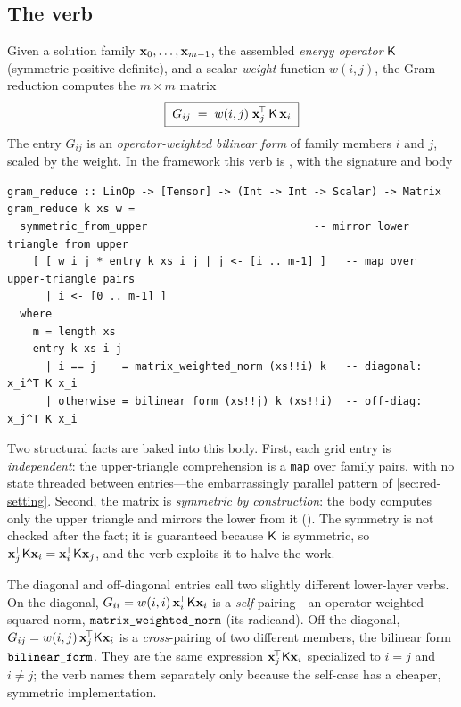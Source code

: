\subsection{The verb}

Given a solution family $\mathbf{x}_0,\dots,\mathbf{x}_{m-1}$, the assembled \emph{energy
operator} $\mathsf{K}$ (symmetric positive-definite), and a scalar \emph{weight}
function $w(i,j)$, the Gram reduction computes the $m\times m$ matrix
\begin{equation}
  \boxed{\;G_{ij} \;=\; w(i,j)\;\mathbf{x}_j^{\!\top}\,\mathsf{K}\,\mathbf{x}_i\;}
  \label{eq:gram-entry}
\end{equation}
The entry $G_{ij}$ is an \emph{operator-weighted bilinear form} of family
members $i$ and $j$, scaled by the weight. In the framework this verb is
, with the signature and body
\begin{lstlisting}[style=l4style]
gram_reduce :: LinOp -> [Tensor] -> (Int -> Int -> Scalar) -> Matrix
gram_reduce k xs w =
  symmetric_from_upper                          -- mirror lower triangle from upper
    [ [ w i j * entry k xs i j | j <- [i .. m-1] ]   -- map over upper-triangle pairs
      | i <- [0 .. m-1] ]
  where
    m = length xs
    entry k xs i j
      | i == j    = matrix_weighted_norm (xs!!i) k   -- diagonal: x_i^T K x_i
      | otherwise = bilinear_form (xs!!j) k (xs!!i)  -- off-diag:  x_j^T K x_i
\end{lstlisting}
Two structural facts are baked into this body. First, each grid entry is
\emph{independent}: the upper-triangle comprehension is a \texttt{map} over
family pairs, with no state threaded between entries---the embarrassingly
parallel pattern of \cref{sec:red-setting}. Second, the matrix is \emph{symmetric
by construction}: the body computes only the upper triangle and mirrors the lower
from it (). The symmetry is not checked after the
fact; it is guaranteed because $\mathsf{K}$ is symmetric, so $\mathbf{x}_j^{\!\top}\mathsf{K}\mathbf{x}_i
=\mathbf{x}_i^{\!\top}\mathsf{K}\mathbf{x}_j$, and the verb exploits it to halve the work.

\begin{notationbox}
The diagonal and off-diagonal entries call two slightly different lower-layer
verbs. On the diagonal, $G_{ii}=w(i,i)\,\mathbf{x}_i^{\!\top}\mathsf{K}\mathbf{x}_i$ is a
\emph{self}-pairing---an operator-weighted squared norm, $\texttt{matrix\_weighted\_norm}$
(its radicand). Off the diagonal, $G_{ij}=w(i,j)\,\mathbf{x}_j^{\!\top}\mathsf{K}\mathbf{x}_i$ is a
\emph{cross}-pairing of two different members, the bilinear form
$\texttt{bilinear\_form}$. They are the same expression $\mathbf{x}_j^{\!\top}\mathsf{K}\mathbf{x}_i$
specialized to $i=j$ and $i\neq j$; the verb names them separately only because
the self-case has a cheaper, symmetric implementation.
\end{notationbox}

